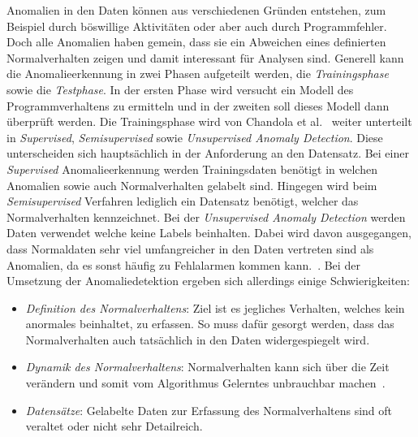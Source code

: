         Anomalien in den Daten können aus verschiedenen Gründen entstehen, zum Beispiel durch böswillige Aktivitäten oder aber auch durch Programmfehler.
        Doch alle Anomalien haben gemein, dass sie ein Abweichen eines definierten Normalverhalten zeigen und damit interessant für Analysen sind.
        Generell kann die Anomalieerkennung in zwei Phasen aufgeteilt werden, die \textit{Trainingsphase} sowie die \textit{Testphase}.
        In der ersten Phase wird versucht ein Modell des Programmverhaltens zu ermitteln und in der zweiten soll dieses Modell dann überprüft werden.
        Die Trainingsphase wird von Chandola et al.~\cite{ANOMALYSURVEY} weiter unterteilt in \textit{Supervised}, \textit{Semisupervised} sowie \textit{Unsupervised Anomaly Detection}.
        Diese unterscheiden sich hauptsächlich in der Anforderung an den Datensatz. 
        Bei einer \textit{Supervised} Anomalieerkennung werden Trainingsdaten benötigt in welchen Anomalien sowie auch Normalverhalten gelabelt sind.
        Hingegen wird beim \textit{Semisupervised} Verfahren lediglich ein Datensatz benötigt, welcher das Normalverhalten kennzeichnet.
        Bei der \textit{Unsupervised Anomaly Detection} werden Daten verwendet welche keine Labels beinhalten.
        Dabei wird davon ausgegangen, dass Normaldaten sehr viel umfangreicher in den Daten vertreten sind als Anomalien, da es sonst häufig zu Fehlalarmen kommen kann.~\cite{ANOMALYSURVEY2}.
        Bei der Umsetzung der Anomaliedetektion ergeben sich allerdings einige Schwierigkeiten:
        
        \begin{itemize}
            \item \textit{Definition des Normalverhaltens}:
                Ziel ist es jegliches Verhalten, welches kein anormales beinhaltet, zu erfassen.
                So muss dafür gesorgt werden, dass das Normalverhalten auch tatsächlich in den Daten widergespiegelt wird. 

            \item \textit{Dynamik des Normalverhaltens}:
                Normalverhalten kann sich über die Zeit verändern und somit vom Algorithmus Gelerntes unbrauchbar machen~\cite{ANOMALYSURVEY}.

            \item \textit{Datensätze}:
                Gelabelte Daten zur Erfassung des Normalverhaltens sind oft veraltet oder nicht sehr Detailreich. 
        \end{itemize}


